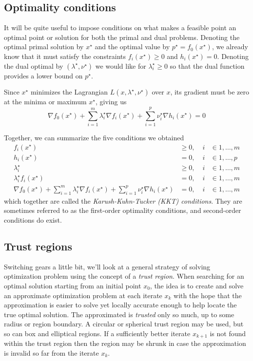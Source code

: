 \subsection{Optimality conditions} \label{ssec:KKT}
It will be quite useful to impose conditions on what makes a feasible point an optimal point or solution for both the primal and dual problems. Denoting the optimal primal solution by $x^\star$ and the optimal value by $p^\star = f_0(x^\star)$, we already know that it must satisfy the constraints $f_i(x^\star) \ge 0$ and $h_i(x^\star) = 0$. Denoting the dual optimal by $(\lambda^\star, \nu^\star)$ we would like for $\lambda_i^\star \ge 0$ so that the dual function provides a lower bound on $p^\star$. 


Since $x^\star$ minimizes the Lagrangian $L(x, \lambda^\star, \nu^\star)$ over $x$, its gradient must be zero at the minima or maximum $x^\star$, giving us
\[
\nabla f_0(x^\star) + \sum_{i=1}^m \lambda_i^\star \nabla f_i(x^\star)
+ \sum_{i=1}^p \nu_i^\star \nabla h_i(x^\star) = 0
\]

Together, we can summarize the five conditions we obtained
\begin{align} \label{eq:kkt}
f_i(x^\star) & \geq 0, \; & i & \in {1,\dots,m} \nonumber \\
h_i(x^\star) & = 0, \; & i & \in {1,\dots,p} \nonumber \\
\lambda_i^\star & \geq 0, \; & i & \in {1,\dots,m} \\
\lambda_i^\star f_i(x^\star) & = 0, \; & i & \in {1,\dots,m} \nonumber \\
\nabla f_0(x^\star) + \sum_{i=1}^m \lambda_i^\star \nabla f_i(x^\star)
+ \sum_{i=1}^p \nu_i^\star \nabla h_i(x^\star) & = 0, \; & i & \in {1,\dots,m} \nonumber
\end{align}
which together are called the \emph{Karush-Kuhn-Tucker (KKT) conditions}. They are sometimes referred to as the first-order optimality conditions, and second-order conditions do exist.

\subsection{Trust regions}
Switching gears a little bit, we'll look at a general strategy of solving optimization problem using the concept of a \emph{trust region}. When searching for an optimal solution starting from an initial point $x_0$, the idea is to create and solve an approximate optimization problem at each iterate $x_k$ with the hope that the approximation is easier to solve yet locally accurate enough to help locate the true optimal solution. The approximated is \emph{trusted} only so much, up to some radius or region boundary. A circular or spherical trust region may be used, but so can box and elliptical regions. If a sufficiently better iterate $x_{k+1}$ is not found within the trust region then the region may be shrunk in case the approximation is invalid so far from the iterate $x_k$.

